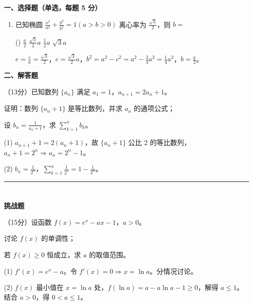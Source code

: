 \noindent\textbf{一、选择题（单选，每题 5 分）}
\begin{enumerate}[itemsep=\mcqItemSep]
    \item 已知椭圆 $\frac{x^2}{a^2}+\frac{y^2}{b^2}=1 (a>b>0)$ 离心率为 $\frac{\sqrt{3}}{2}$，则 $b=$
    \begin{tasks}(\mcqTasksCols)
        \task $\frac{a}{2}$
        \task $\frac{\sqrt{3}}{2}a$
        \task $\frac{1}{2}a$
        \task $\sqrt{3}a$
    \end{tasks}
    \begin{solution}
        \jieti $e=\frac{c}{a}=\frac{\sqrt{3}}{2}$，$c=\frac{\sqrt{3}}{2}a$，$b^2=a^2-c^2=a^2-\frac{3}{4}a^2=\frac{1}{4}a^2$，$b=\frac{a}{2}$。
    \end{solution}
\end{enumerate}

\noindent\textbf{二、解答题}
\begin{examenum}[itemsep=\saqItemSep]
    \item （13分）已知数列 $\{a_n\}$ 满足 $a_1=1$，$a_{n+1}=2a_n+1$。
    \begin{examenum}
        \item 证明：数列 $\{a_n+1\}$ 是等比数列，并求 $a_n$ 的通项公式；
        \item 设 $b_n=\frac{1}{a_n+1}$，求 $\sum_{k=1}^n b_k$。
    \end{examenum}
    \begin{solution}
        \jieti (1) $a_{n+1}+1=2(a_n+1)$，故 $\{a_n+1\}$ 公比 2 的等比数列，$a_n+1=2^n\Rightarrow a_n=2^n-1$。\par
        (2) $b_n=\frac{1}{2^n}$，$\sum_{k=1}^n \frac{1}{2^k}=1-\frac{1}{2^n}$。
    \end{solution}
\end{examenum}
\fi

\ifdefined\tierD
\vspace{1em}
\hrule
\vspace{1em}
\section*{\tierD}
\vspace{0.5em}

\noindent\textbf{挑战题}
\begin{examenum}[itemsep=\saqItemSep]
    \item （15分）设函数 $f(x)=e^x-ax-1$，$a>0$。
    \begin{examenum}
        \item 讨论 $f(x)$ 的单调性；
        \item 若 $f(x)\ge 0$ 恒成立，求 $a$ 的取值范围。
    \end{examenum}
    \begin{solution}
        \jieti (1) $f'(x)=e^x-a$。令 $f'(x)=0\Rightarrow x=\ln a$。分情况讨论。\par
        (2) $f(x)$ 最小值在 $x=\ln a$ 处，$f(\ln a)=a-a\ln a-1\ge 0$，解得 $a\le 1$。结合 $a>0$，得 $0<a\le 1$。
    \end{solution}
\end{examenum}
\fi

